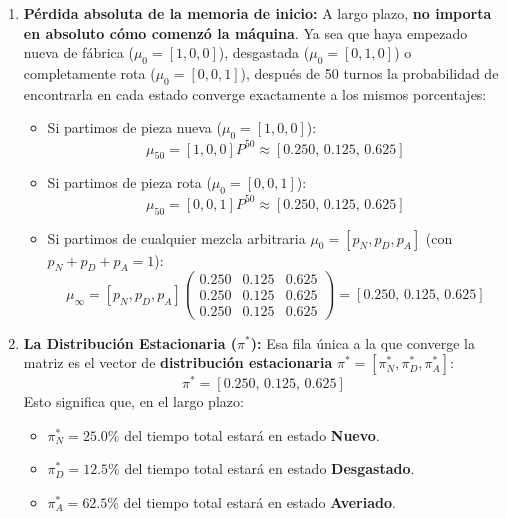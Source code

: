 \begin{enumerate}
  \item \textbf{Pérdida absoluta de la memoria de inicio:} 
  A largo plazo, \textbf{no importa en absoluto cómo comenzó la máquina}. Ya sea que haya empezado nueva de fábrica ($\mu_0 = [1, 0, 0]$), desgastada ($\mu_0 = [0, 1, 0]$) o completamente rota ($\mu_0 = [0, 0, 1]$), después de 50 turnos la probabilidad de encontrarla en cada estado converge exactamente a los mismos porcentajes:
  \begin{itemize}
    \item Si partimos de pieza nueva ($\mu_0 = [1, 0, 0]$):
    \[
      \mu_{50} = [1, 0, 0] P^{50} \approx [0.250, \, 0.125, \, 0.625]
    \]
    \item Si partimos de pieza rota ($\mu_0 = [0, 0, 1]$):
    \[
      \mu_{50} = [0, 0, 1] P^{50} \approx [0.250, \, 0.125, \, 0.625]
    \]
    \item Si partimos de cualquier mezcla arbitraria $\mu_0 = [p_N, p_D, p_A]$ (con $p_N + p_D + p_A = 1$):
    \begin{equation*}
      \mu_\infty = [p_N, p_D, p_A] 
      \begin{pmatrix}
        0.250 & 0.125 & 0.625 \\
        0.250 & 0.125 & 0.625 \\
        0.250 & 0.125 & 0.625
      \end{pmatrix}
      = \mathbf{[0.250, \, 0.125, \, 0.625]}
    \end{equation*}
  \end{itemize}

  \item \textbf{La Distribución Estacionaria ($\pi^*$):}
  Esa fila única a la que converge la matriz es el vector de \textbf{distribución estacionaria} $\pi^* = [\pi_N^*, \pi_D^*, \pi_A^*]$:
  \begin{equation*}
    \pi^* = [0.250, \, 0.125, \, 0.625]
  \end{equation*}
  Esto significa que, en el largo plazo:
  \begin{itemize}
    \item $\pi_N^* = \mathbf{25.0\%}$ del tiempo total estará en estado \textbf{Nuevo}.
    \item $\pi_D^* = \mathbf{12.5\%}$ del tiempo total estará en estado \textbf{Desgastado}.
    \item $\pi_A^* = \mathbf{62.5\%}$ del tiempo total estará en estado \textbf{Averiado}.
  \end{itemize}
\end{enumerate}

